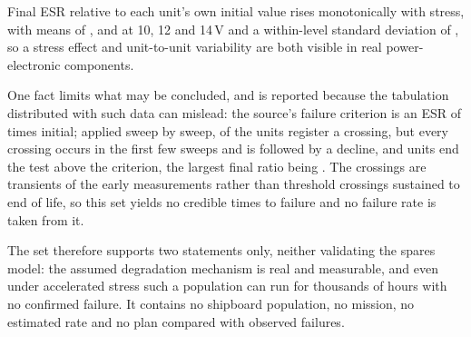 Final ESR relative to each unit's own initial value rises monotonically with
stress, with means of \capFinalTen, \capFinalTwelve{} and \capFinalFourteen{} at
10, 12 and 14\,V and a within-level standard deviation of \capSd, so a stress
effect and unit-to-unit variability are both visible in real power-electronic
components.

One fact limits what may be concluded, and is reported because the tabulation
distributed with such data can mislead: the source's failure criterion is an ESR
of \capCrit{} times initial; applied sweep by sweep, \capAnyCross{} of the
\capUnits{} units register a crossing, but every crossing occurs in the first few
sweeps and is followed by a decline, and \capEndsAbove{} units end the test above
the criterion, the largest final ratio being \capMaxFinal. The crossings are
transients of the early measurements rather than threshold crossings sustained to
end of life, so this set yields no credible times to failure and no failure rate
is taken from it.

The set therefore supports two statements only, neither validating the spares
model: the assumed degradation mechanism is real and measurable, and even under
accelerated stress such a population can run for thousands of hours with no
confirmed failure. It contains no shipboard population, no mission, no estimated
rate and no plan compared with observed failures.



